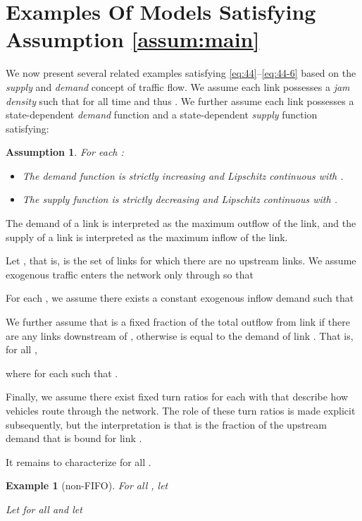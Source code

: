 \documentclass[letterpaper, 10 pt, conference]{ieeeconf}
\newtheorem{assum}{Assumption}
\newtheorem{example}{Example}
\begin{document}
\section{Examples Of Models Satisfying Assumption \ref{assum:main}}
\label{sec:examples}


We now present several related examples satisfying \ref{eq:44}--\ref{eq:44-6} based on the \emph{supply} and \emph{demand} concept of traffic flow. We assume each link  possesses a \emph{jam density}  such that  for all time and thus . We further assume each link possesses a state-dependent \emph{demand} function  and a state-dependent \emph{supply} function  satisfying:
\begin{assum}
\label{assum:2}
  For each :
  \begin{itemize}
  \item The demand function  is strictly increasing and Lipschitz continuous with .
  \item The supply function  is strictly decreasing and Lipschitz continuous with .
  \end{itemize}
\end{assum}

The demand of a link is interpreted as the maximum outflow of the link, and the supply of a link is interpreted as the maximum inflow of the link. 

Let , that is,  is the set of links for which there are no upstream links. We assume exogenous traffic enters the network only through  so that


For each , we assume there exists a constant exogenous inflow demand  such that


We further assume that  is a fixed fraction  of the total outflow from link  if there are any links downstream of , otherwise  is equal to the demand of link . That is, for all ,

where  for each  such that .


Finally, we assume there exist fixed turn ratios  for each  with  that describe how vehicles route through the network. The role of these turn ratios is made explicit subsequently, but the interpretation is that  is the fraction of the upstream demand that is bound for link . 



 It remains to characterize  for all .

\begin{example}[non-FIFO]
\label{ex:1}
For all , let
  
Let  for all  and let

\end{example}
\end{document}
